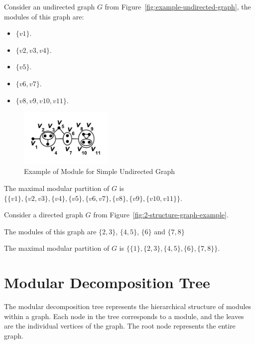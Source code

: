 \begin{myex}
    \label{ex:simple-undirected-graph}

Consider an undirected graph $G$ from Figure~\ref{fig:example-undirected-graph}, the modules of this graph are:

\begin{itemize}
    \item $\{v1\}$.
    \item $\{v2, v3, v4\}$.
    \item $\{v5\}$.
    \item $\{v6, v7\}$.
    \item $\{v8, v9, v10, v11\}$.
\end{itemize}

\begin{figure}[!h]
    \centering
    \includegraphics[width=0.40\textwidth]{images/graphs/undirected_graph_wikipedia_module}
    \caption{Example of Module for Simple Undirected Graph}
    \label{fig:example-undirected-graph-module}
\end{figure}

The maximal modular partition of $G$ is $\{\{v1\}, \{v2, v3\}, \{v4\}, \{v5\}, \{v6, v7\}, \{v8\}, \{v9\}, \{v10, v11\}\}$.
\end{myex}

\begin{myex}
    Consider a directed graph $G$ from Figure~\ref{fig:2-structure-graph-example}.

    The modules of this graph are $\{2, 3\}$, $\{4, 5\}$, $\{6\}$ and $\{7, 8\}$

    The maximal modular partition of $G$ is $\{\{1\}, \{2, 3\}, \{4, 5\}, \{6\}, \{7, 8\}\}$.
\end{myex}


\section{Modular Decomposition Tree}\label{sec:modular-decomposition-tree}

The modular decomposition tree represents the hierarchical structure of modules within a graph.
Each node in the tree corresponds to a module, and the leaves are the individual vertices of the graph.
The root node represents the entire graph.

